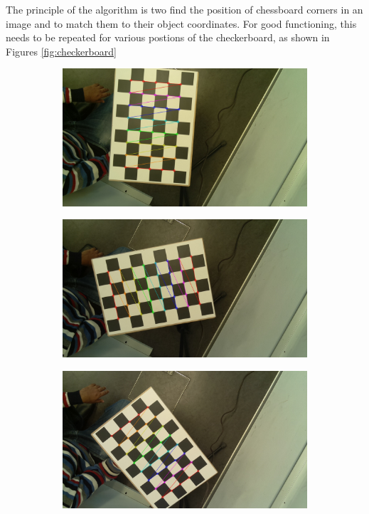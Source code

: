 The principle of the algorithm is two find the position of chessboard corners in an image and to match them to their object coordinates. For good functioning, this needs to be repeated for various postions of the checkerboard, as shown in Figures \ref{fig:checkerboard}

\begin{figure}[H]
    \centering
    \begin{subfigure}{0.24\linewidth}
        \includegraphics[width=\linewidth]{files/output145_1.jpg}
    \end{subfigure} 
    \begin{subfigure}{0.24\linewidth}
        \includegraphics[width=\linewidth]{files/output145_2.jpg}
    \end{subfigure}
    \begin{subfigure}{0.24\linewidth}
        \includegraphics[width=\linewidth]{files/output145_3.jpg}

\end{subfigure}
\end{figure}
